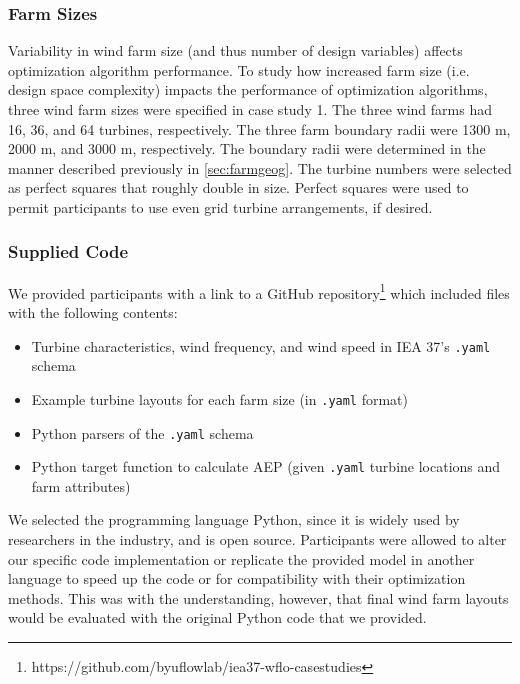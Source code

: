 	\subsubsection{Farm Sizes}
        Variability in wind farm size (and thus number of design variables) affects optimization algorithm performance.
        To study how increased farm size (i.e. design space complexity) impacts the performance of optimization algorithms, three wind farm sizes were specified in case study 1. The three wind farms had 16, 36, and 64 turbines, respectively.
        The three farm boundary radii were 1300 m, 2000 m, and 3000 m, respectively. The boundary radii were determined in the manner described previously in \cref{sec:farmgeog}.
        The turbine numbers were selected as perfect squares that roughly double in size.
        Perfect squares were used to permit participants to use even grid turbine arrangements, if desired.
        
    \subsubsection{Supplied Code} \label{sec:code}

        We provided participants with a link to a GitHub repository\footnote{https://github.com/byuflowlab/iea37-wflo-casestudies} which included files with the following contents:
            \begin{itemize}
                \item Turbine characteristics, wind frequency, and wind speed in IEA 37's \texttt{.yaml} schema
                \item Example turbine layouts for each farm size (in \texttt{.yaml} format)
                \item Python parsers of the \texttt{.yaml} schema
                \item Python target function to calculate AEP (given \texttt{.yaml} turbine locations and farm attributes)
            \end{itemize}
        We selected the programming language Python, since it is widely used by researchers in the industry, and is open source. Participants were allowed to alter our specific code implementation or replicate the provided model in another language to speed up the code or for compatibility with their optimization methods. 
        This was with the understanding, however, that final wind farm layouts would be evaluated with the original Python code that we provided.